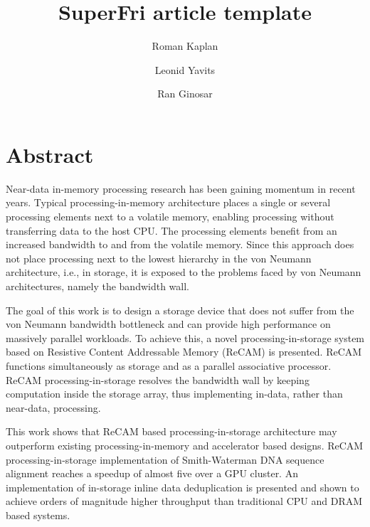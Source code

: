 \documentclass{superfri}
\begin{document}
\author{Roman Kaplan\footnotemark \and Leonid Yavits\footnotemark[\value{footnote}] \and Ran Ginosar\footnotemark[\value{footnote}]}

\title{SuperFri article template}

\maketitle{}

\begin{abstract}

\end{abstract}

\section*{Abstract}
\label{sec:abstract}
Near-data in-memory processing research has been gaining momentum in recent years. Typical processing-in-memory architecture places a single or several processing elements next to a volatile memory, enabling processing without transferring data to the host CPU. The processing elements benefit from an increased bandwidth to and from the volatile memory. Since this approach does not place processing next to the lowest hierarchy in the von Neumann architecture, i.e., in storage, it is exposed to the problems faced by von Neumann architectures, namely the bandwidth wall. 

The goal of this work is to design a storage device that does not suffer from the von Neumann bandwidth bottleneck and can provide high performance on massively parallel workloads. To achieve this, a novel processing-in-storage system based on Resistive Content Addressable Memory (ReCAM) is presented. ReCAM functions simultaneously as storage and as a parallel associative processor. ReCAM processing-in-storage resolves the bandwidth wall by keeping computation inside the storage array, thus implementing in-data, rather than near-data, processing. 

This work shows that ReCAM based processing-in-storage architecture may outperform existing processing-in-memory and accelerator based designs. ReCAM processing-in-storage implementation of Smith-Waterman DNA sequence alignment reaches a speedup of almost five over a GPU cluster. An implementation of in-storage inline data deduplication is presented and shown to achieve orders of magnitude higher throughput than traditional CPU and DRAM based systems.
\end{document}
